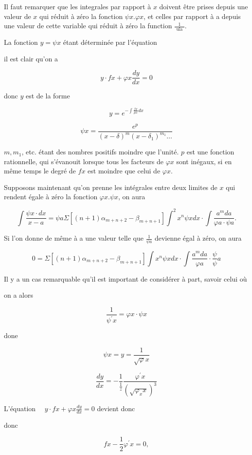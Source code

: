 \documentclass{article}
\begin{document}
Il faut remarquer que les integrales par rapport à \(x\) doivent être prises depuis une valeur de \(x\) qui réduit à zéro la fonction \(\psi x . \varphi x\), et celles par rapport à a depuis une valeur de cette variable qui réduit à zéro la function \(\frac{1}{\text { ula }}\).

La fonction \(y=\psi x\) étant déterminée par l'équation

il est clair qu'on a

\[
y \cdot f x+\varphi x \frac{d y}{d x}=0
\]

donc \(y\) est de la forme

\[
y=e^{-\int \frac{f x}{\mu x} d x}
\]

\[
\psi x=\frac{e^{p}}{(x-\delta)^{m}\left(x-\delta_{1}\right)^{m_{1}} \ldots}
\]

\(m, m_{1}\), etc. étant des nombres positifs moindre que l'unité. \(p\) est une fonction rationnelle, qui s'évanouit lorsque tous les facteurs de \(\varphi x\) sont inégaux, si en même temps le degré de \(f x\) est moindre que celui de \(\varphi x\).

Supposons maintenant qu'on prenne les intégrales entre deux limites de \(x\) qui rendent égale à zéro la fonction \(\varphi x . \psi x\), on aura

\[
\int \frac{\psi x \cdot d x}{x-a}=\psi a \Sigma\left[(n+1) \alpha_{m+n+2}-\beta_{m+n+1}\right] \int^{2} x^{n} \psi x d x \cdot \int \frac{a^{m} d a}{\varphi a \cdot \psi a} .
\]

Si l'on donne de même à a une valeur telle que \(\frac{1}{\psi a}\) devienne égal à zéro, on aura

\[
0=\Sigma\left[(n+1) \alpha_{m+n+2}-\beta_{m+n+1}\right] \int x^{n} \psi x d x \cdot \int \frac{a^{m} d a}{\varphi a} \cdot \frac{\psi}{\psi} a
\]

Il y a un cas remarquable qu'il est important de considérer à part, savoir celui où

on a alors

\[
\frac{1}{\psi^{\prime} x}=\varphi x \cdot \psi x
\]

done

\[
\psi x=y=\frac{1}{\sqrt{\varphi} x}
\]

\[
\frac{d y}{d x}=-\frac{1}{\frac{1}{z}} \frac{\varphi^{\prime} x}{\left(\sqrt{\varphi_{x} x}\right)^{3}}
\]

L'équation \(\quad y \cdot f x+\varphi x \frac{d y}{d x}=0\) devient donc

donc

\[
f x-\frac{1}{2} \varphi^{\prime} x=0,
\]
\end{document}
